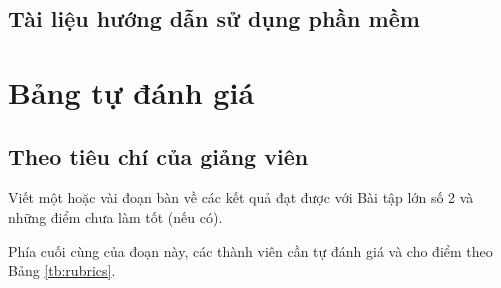 \documentclass[a4paper]{article}
\begin{document}
\subsection{Tài liệu hướng dẫn sử dụng phần mềm}


\section{Bảng tự đánh giá}
\subsection{Theo tiêu chí của giảng viên}
Viết một hoặc vài đoạn bàn về các kết quả đạt được với Bài tập lớn số 2 và những điểm chưa làm tốt (nếu có).

Phía cuối cùng của đoạn này, các thành viên cần tự đánh giá và cho điểm theo Bảng \ref{tb:rubrics}.
\end{document}
